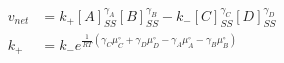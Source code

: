 \begin{eqnarray}
v_{net} & = k_+[A]_{SS}^{\gamma_A}[B]_{SS}^{\gamma_B} - k_-[C]_{SS}^{\gamma_C}[D]_{SS}^{\gamma_D} \\
k_+ &=  k_-e^{\frac{1}{RT}\left(\gamma_C\mu_C^\circ+ \gamma_D\mu_D^\circ -\gamma_A\mu_A^\circ-\gamma_B\mu_B^\circ\right)} \\
\end{eqnarray}